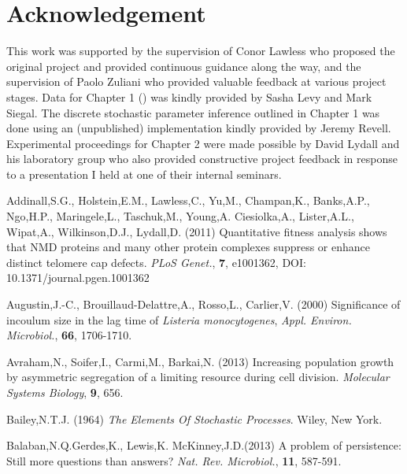 \documentclass{bioinfo}
\begin{document}
{\vspace{-2em}
\section*{Acknowledgement}
This work was supported by the supervision of Conor Lawless who proposed the original project and provided continuous guidance along the way, and the supervision of Paolo Zuliani who provided valuable feedback at various project stages. Data for Chapter 1 (\citealp{Levy12}) was kindly provided by Sasha Levy and Mark Siegal. The discrete stochastic parameter inference outlined in Chapter 1 was done using an (unpublished) implementation kindly provided by Jeremy Revell. Experimental proceedings for Chapter 2 were made possible by David Lydall and his laboratory group who also provided constructive project feedback in response to a presentation I held at one of their internal seminars.  

\vspace{-2em}
\begin{thebibliography}{}

 Addinall,S.G., Holstein,E.M., Lawless,C., Yu,M., Champan,K., Banks,A.P., Ngo,H.P., Maringele,L., Taschuk,M., Young,A. Ciesiolka,A., Lister,A.L., Wipat,A., Wilkinson,D.J., Lydall,D. (2011) Quantitative fitness analysis shows that NMD proteins and many other protein complexes suppress or enhance distinct telomere cap defects. {\it PLoS Genet.}, {\bf 7}, e1001362, DOI: 10.1371/journal.pgen.1001362

Augustin,J.-C., Brouillaud-Delattre,A., Rosso,L., Carlier,V. (2000) Significance of incoulum size in the lag time of \textit{Listeria monocytogenes}, \textit{Appl. Environ. Microbiol.}, \textbf{66}, 1706-1710. 

Avraham,N., Soifer,I., Carmi,M., Barkai,N. (2013) Increasing population growth by asymmetric segregation of a limiting resource during cell division. \textit{Molecular Systems Biology}, \textbf{9}, 656. 

 Bailey,N.T.J. (1964) \textit{The Elements Of Stochastic Processes}. Wiley, New York.

Balaban,N.Q.Gerdes,K., Lewis,K. McKinney,J.D.(2013) A problem of persistence: Still more questions than answers? \textit{Nat. Rev. Microbiol.}, \textbf{11}, 587-591. 


\end{thebibliography}}
\end{document}
